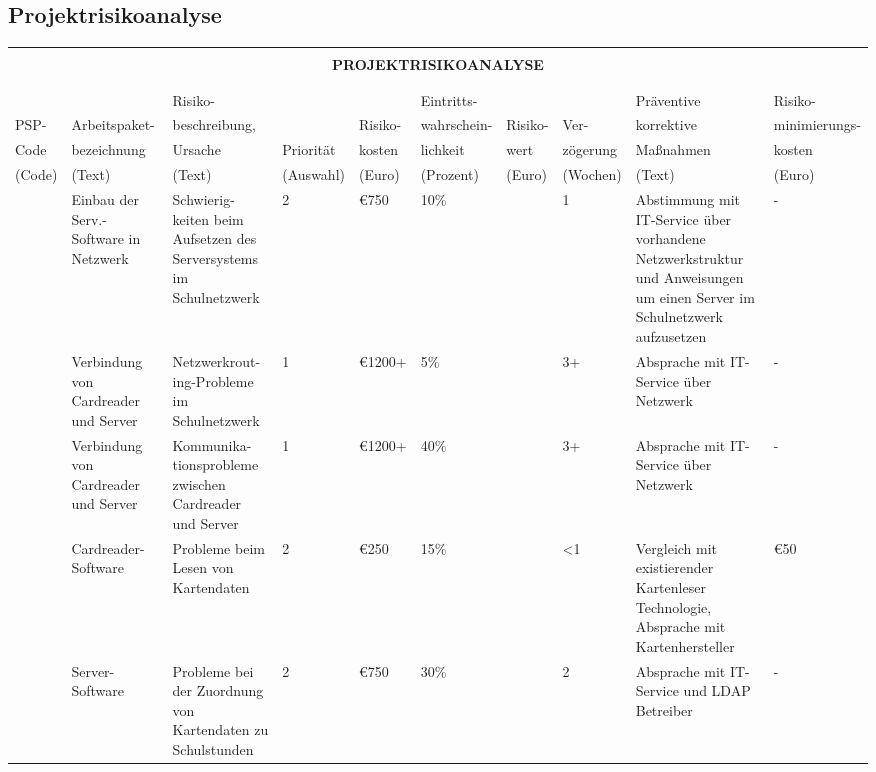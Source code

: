 \subsection{Projektrisikoanalyse}
\begingroup
\renewcommand*{\arraystretch}{1.1} %
\begin{center}
\begin{tiny}
\begin{tabularx}{\textwidth}{|l|p{1.1cm}|X|l|l|l|p{0.5cm}|l|X|X|}
    \hline
    \multicolumn{10}{|c|}{\vspace{-0.02cm} \rowcolor{gray}} \\
    \multicolumn{10}{|c|}{\rowcolor{gray} \bfseries \normalsize \color{white} PROJEKTRISIKOANALYSE \vspace{-0.05cm}} \\
    \multicolumn{10}{|c|}{\rowcolor{gray}} \\
    \hline
    & & & & & & & & &\\
    & & Risiko- & & & Eintritts- & & & Präventive & Risiko-\\
    PSP- & Arbeitspaket- & beschreibung, & & Risiko- & wahrschein- & Risiko- & Ver- & korrektive & minimierungs- \\
    Code & bezeichnung & Ursache & Priorität & kosten & lichkeit & wert & zögerung & Maßnahmen & kosten \\
    \hline 
    (Code) & (Text) & (Text) & (Auswahl) & (Euro) & (Prozent) & (Euro) & (Wochen) & (Text) & (Euro) \\
    \hline
    [0303] & Einbau der Serv.-Software in Netzwerk & Schwierig- keiten beim Aufsetzen des Serversystems im Schulnetzwerk & 2 & €750 & 10\% & & 1 & Abstimmung mit IT-Service über vorhandene Netzwerkstruktur und Anweisungen um einen Server im Schulnetzwerk aufzusetzen &-\\
    \hline
    [0305]& Verbindung von Cardreader und Server & Netzwerkrout- ing-Probleme im Schulnetzwerk & 1 & €1200+ & 5\% & & 3+ & Absprache mit IT-Service über Netzwerk & -\\
    \hline
    [0305]& Verbindung von Cardreader und Server & Kommunika- tionsprobleme zwischen Cardreader und Server & 1 & €1200+ & 40\% & & 3+ & Absprache mit IT-Service über Netzwerk & -\\
    \hline
    [0301]& Cardreader-Software & Probleme beim Lesen von Kartendaten & 2 & €250 & 15\% & & <1 & Vergleich mit existierender Kartenleser Technologie, Absprache mit Kartenhersteller & €50\\
    \hline
    [0302]& Server-Software & Probleme bei der Zuordnung von Kartendaten zu Schulstunden & 2 & €750 & 30\% & & 2 & Absprache mit IT-Service und LDAP Betreiber & -\\

\end{tabularx}
\end{tiny}
\end{center}
